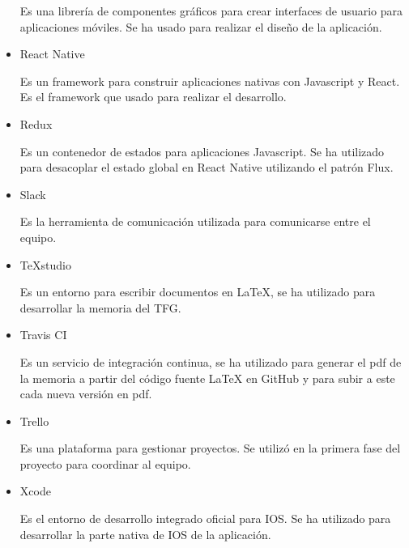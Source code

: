 \begin{itemize}
	Es una librería de componentes gráficos para crear interfaces de usuario para aplicaciones móviles. Se ha usado
	para realizar el diseño de la aplicación.
	
	\item React Native~\cite{RENA}~\cite{REACTBOOK}
	
	Es un framework para construir aplicaciones nativas con Javascript y React. Es el framework que usado
	 para realizar el desarrollo.
	
	\item Redux~\cite{REDUX}
	
	Es un contenedor de estados para aplicaciones Javascript. Se ha utilizado para desacoplar el estado 
	global en React Native utilizando el patrón Flux.
	
	\item Slack~\cite{SLACK}
	
	Es la herramienta de comunicación utilizada para comunicarse entre el equipo.
	
	\item TeXstudio
	
	Es un entorno para escribir documentos en \LaTeX{}, se ha utilizado para desarrollar la 
	memoria del TFG.
	
	\item Travis CI~\cite{TRAVIS}
	
	Es un servicio de integración continua, se ha utilizado para generar el pdf de la memoria a partir del código 
	fuente \LaTeX{} en GitHub y para subir a este cada nueva versión en pdf.
	
	\item Trello
	
	Es una plataforma para gestionar proyectos. Se utilizó en la primera fase del proyecto para coordinar al 
	equipo.
	
	\item Xcode~\cite{XCODE}
	
	Es el entorno de desarrollo integrado oficial para IOS. Se ha utilizado para desarrollar la parte nativa 
	de IOS de la aplicación.
	
\end{itemize}

